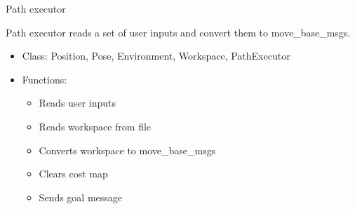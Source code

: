 \begin{frame}{Path executor}
    
    Path executor reads  a set of user inputs and convert them to move\_base\_msgs.
    \begin{itemize}
        \item Class: Position, Pose, Environment, Workspace, PathExecutor
        
        \item Functions:
        \begin{itemize}
        	\item Reads user inputs
        	\item Reads workspace from file
            \item Converts workspace to move\_base\_msgs
            \item Clears cost map
            \item Sends goal message
        \end{itemize}
    \end{itemize}
    
\end{frame}

